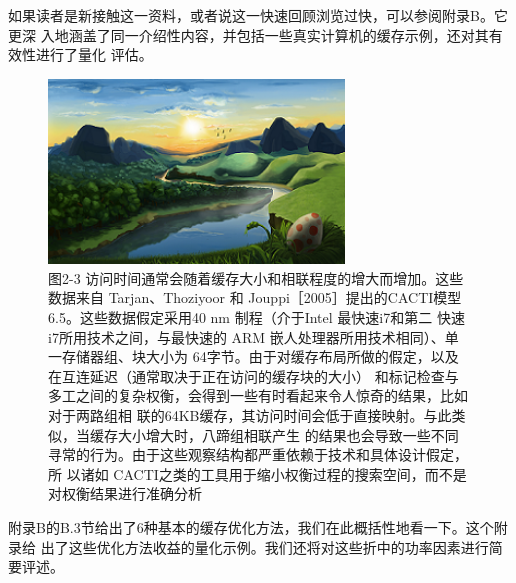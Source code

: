 如果读者是新接触这一资料，或者说这一快速回顾浏览过快，可以参阅附录B。它更深
入地涵盖了同一介绍性内容，并包括一些真实计算机的缓存示例，还对其有效性进行了量化
评估。

\begin{figure}[!htb]
    \centering
	\includegraphics[width=0.7\textwidth]{imgs/sam.png}
	\caption{图2-3 访问时间通常会随着缓存大小和相联程度的增大而增加。这些数据来自 Tarjan、Thoziyoor 和
            Jouppi［2005］提出的CACTI模型6.5。这些数据假定采用40 nm 制程（介于Intel 最快速i7和第二
            快速 i7所用技术之间，与最快速的 ARM 嵌人处理器所用技术相同）、单一存储器组、块大小为
            64字节。由于对缓存布局所做的假定，以及在互连延迟（通常取决于正在访问的缓存块的大小）
            和标记检查与多工之间的复杂权衡，会得到一些有时看起来令人惊奇的结果，比如对于两路组相
            联的64KB缓存，其访问时间会低于直接映射。与此类似，当缓存大小增大时，八蹄组相联产生
            的结果也会导致一些不同寻常的行为。由于这些观察结构都严重依赖于技术和具体设计假定，所
            以诸如 CACTI之类的工具用于缩小权衡过程的搜索空间，而不是对权衡结果进行准确分析}
\end{figure}

附录B的B.3节给出了6种基本的缓存优化方法，我们在此概括性地看一下。这个附录给
出了这些优化方法收益的量化示例。我们还将对这些折中的功率因素进行简要评述。

